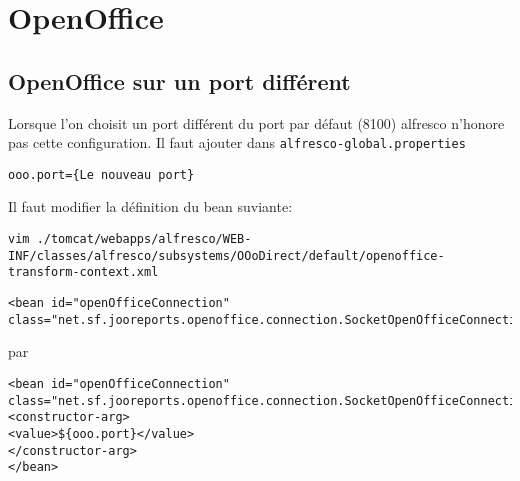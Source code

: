 \section{OpenOffice}
\subsection{OpenOffice sur un port différent}

Lorsque l'on choisit un port différent du port par défaut (8100) alfresco n'honore pas cette configuration.
Il faut ajouter dans \verb|alfresco-global.properties| 

\begin{verbatim}
ooo.port={Le nouveau port}	
\end{verbatim}

Il faut modifier la définition du bean suviante:
\begin{verbatim}
vim ./tomcat/webapps/alfresco/WEB-INF/classes/alfresco/subsystems/OOoDirect/default/openoffice-transform-context.xml
\end{verbatim}
\begin{verbatim}
<bean id="openOfficeConnection" class="net.sf.jooreports.openoffice.connection.SocketOpenOfficeConnection"/>
\end{verbatim}

par

\begin{verbatim}
<bean id="openOfficeConnection" class="net.sf.jooreports.openoffice.connection.SocketOpenOfficeConnection">
<constructor-arg>
<value>${ooo.port}</value>
</constructor-arg>
</bean>
\end{verbatim}